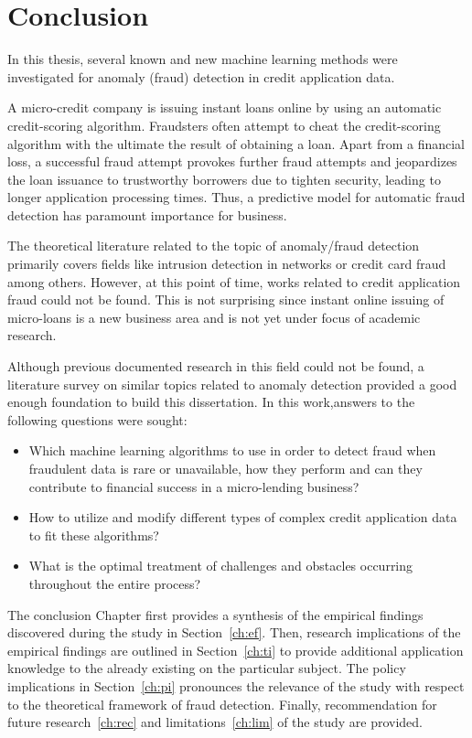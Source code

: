 \chapter{Conclusion}\label{Chapter:7}

In this thesis, several known and new machine learning methods were investigated for anomaly (fraud) detection in credit application data.

A micro-credit company is issuing instant loans online by using an automatic credit-scoring algorithm. Fraudsters often attempt to cheat the credit-scoring algorithm with the ultimate
the result of obtaining a loan. Apart from a financial loss, a successful fraud attempt provokes further fraud attempts and jeopardizes the loan issuance to trustworthy borrowers due to tighten security, leading to longer application processing times. Thus, a predictive model for automatic fraud detection has paramount importance for business.

The theoretical literature related to the topic of anomaly/fraud detection primarily covers fields like intrusion detection in networks or credit card fraud among others. However, at this point of time, works related to credit application fraud could not be found. This is not surprising since instant online issuing of micro-loans is a new business area and is not yet under focus of academic research. 

Although previous documented research in this field could not be found, a literature survey on similar topics related to anomaly detection provided a good enough foundation to build this dissertation. In this work,answers to the following questions were sought: 

\begin{itemize}
        \item Which machine learning algorithms to use in order to detect fraud when fraudulent data is rare or unavailable, how they perform and can they contribute to financial success in a micro-lending business?
    
        \item How to utilize and modify different types of complex credit application data to fit these algorithms?
        
        \item What is the optimal treatment of challenges and obstacles occurring throughout the entire process?
        
\end{itemize}

The conclusion Chapter first provides a synthesis of the empirical findings discovered during the study in Section~\ref{ch:ef}. Then, research implications of the empirical findings are outlined in Section~\ref{ch:ti} to provide additional application knowledge to the already existing on the particular subject. The policy implications in Section~\ref{ch:pi} pronounces the relevance of the study with respect to the theoretical framework of fraud detection. Finally, recommendation for future research~\ref{ch:rec} and limitations~\ref{ch:lim} of the study are provided.


